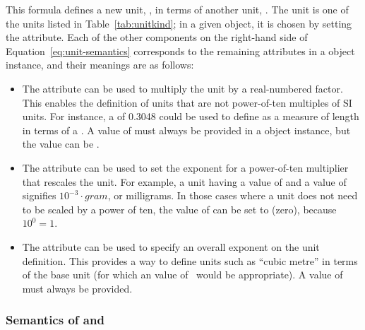 This formula defines a new unit, \unew, in terms of another unit,
\ukind.  The unit \ukind is one of the units listed in
Table~\ref{tab:unitkind}; in a given \Unit object, it is
chosen by setting the  attribute.  Each of the other
components on the right-hand side of
Equation~\ref{eq:unit-semantics} corresponds to the remaining
attributes in a \Unit object instance, and their meanings are as
follows:
\begin{itemize}

\item The  attribute can be used to multiply the
   unit by a real-numbered factor.  This enables the
  definition of units that are not power-of-ten multiples of SI
  units.  For instance, a  of 0.3048 could be
  used to define  as a measure of length in terms of a
  .  A value of  must always be
  provided in a \Unit object instance, but the value can be
  .

\item The  attribute can be used to set the exponent
  for a power-of-ten multiplier that rescales the unit.  For
  example, a unit having a  value of  and a
   value of  signifies $10^{-3} \cdot gram$,
  or milligrams.  In those cases where a unit does not need to be
  scaled by a power of ten, the value of  can be set
  to  (zero), because $10^0 = 1$.

\item The  attribute can be used to specify an
  overall exponent on the unit definition.  This provides a way to
  define units such as ``cubic metre'' in terms of the base unit
   (for which an  value of~
  would be appropriate).  A value of  must always
  be provided.

\end{itemize}


\subsubsection{Semantics of  and }
\label{sec:unit-structure:semantics}

